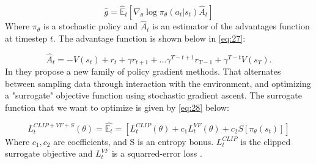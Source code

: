 \documentclass{kththesis}
\theoremstyle{definition}
\begin{document}
\begin{equation}
    \label{eq:26}
    \hat{g} = \hat{\mathbb{E}}_{t}\left[\nabla_{\theta} \log{\pi_{\theta}(a_t|s_t)\hat{A}_{t}} \right]
\end{equation}
Where $\pi_{\theta}$ is a stochastic policy and $\hat{A}_{t}$ is an estimator of the advantages function at timestep $t$. The advantage function is shown below in \autoref{eq:27}:

\begin{equation}
    \label{eq:27}
    \hat{A}_{t} = -V(s_t) + r_t +\gamma r_{t+1} + ... \gamma^{T-t+1} r_{T-1} + \gamma^{T-t}V(s_T).
\end{equation}
In \textcite{schulman2017proximal} they propose a new family of policy gradient methods. That alternates between sampling data through interaction with the environment, and optimizing a "surrogate" objective function using stochastic gradient ascent.  The surrogate function that we want to optimize is given by \autoref{eq:28} below: 

\begin{equation}
    \label{eq:28}
    L_{t}^{CLIP + VF+ S}(\theta) = \hat{\mathbb{E}_{t}} = \left[L_{t}^{CLIP}(\theta) + c_1 L_{t}^{VF}(\theta) + c_2S[\pi_{\theta}(s_t)]\right]
\end{equation}
Where $c_1,c_2$ are coefficients, and S is an entropy bonus. $L_{t}^{CLIP}$ is the clipped surrogate objective and $L_{t}^{VF}$ is a squarred-error loss \parencite{schulman2017proximal}.
\end{document}

